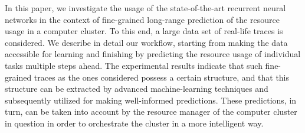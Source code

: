 In this paper, we investigate the usage of the state-of-the-art recurrent neural
networks in the context of fine-grained long-range prediction of the resource
usage in a computer cluster. To this end, a large data set of real-life traces
is considered. We describe in detail our workflow, starting from making the data
accessible for learning and finishing by predicting the resource usage of
individual tasks multiple steps ahead. The experimental results indicate that
such fine-grained traces as the ones considered possess a certain structure, and
that this structure can be extracted by advanced machine-learning techniques and
subsequently utilized for making well-informed predictions. These predictions,
in turn, can be taken into account by the resource manager of the computer
cluster in question in order to orchestrate the cluster in a more intelligent
way.
